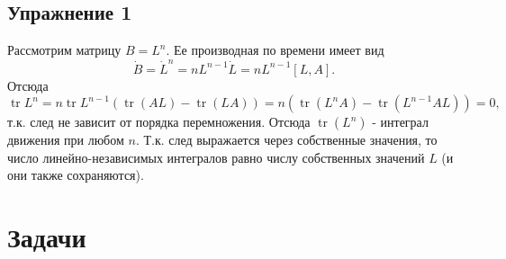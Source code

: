 \documentclass[12pt,a4paper]{article}
\newcommand{\tr}{\mathop{\mathrm{tr}}\nolimits}
\begin{document}
\subsection*{Упражнение 1}
\noindent Рассмотрим матрицу $B = L^n$. Ее производная по времени имеет вид
\begin{equation}
\dot{B} = \dot{L}^n = nL^{n-1}\dot{L} = nL^{n-1}[L,A].
\end{equation}
Отсюда
\begin{equation}
\tr L^n = n\tr L^{n-1}(\tr(AL)-\tr(LA)) = n(\tr(L^{n}A) - \tr(L^{n-1}AL))=0,
\end{equation}
т.к. след не зависит от порядка перемножения. Отсюда $\tr(L^n)$ - интеграл движения при любом $n$. Т.к. след выражается через собственные значения, то число линейно-независимых интегралов равно числу собственных значений $L$ (и они также сохраняются).
\section{Задачи}
\end{document}
